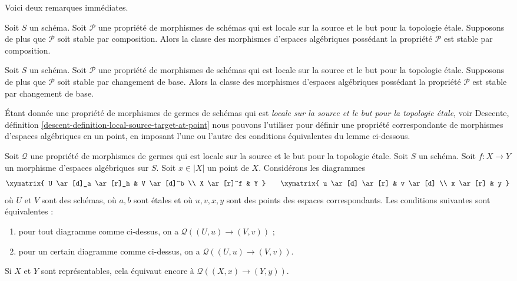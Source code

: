 \noindent
Voici deux remarques immédiates.

\begin{remark}
\label{remark-composition-P}
Soit $S$ un schéma. Soit $\mathcal{P}$ une propriété de morphismes de schémas
qui est locale sur la source et le but pour la topologie étale. Supposons de plus
que $\mathcal{P}$ soit stable par composition. Alors la classe des morphismes
d'espaces algébriques possédant la propriété $\mathcal{P}$ est stable par composition.
\end{remark}

\begin{remark}
\label{remark-base-change-P}
Soit $S$ un schéma. Soit $\mathcal{P}$ une propriété de morphismes de schémas
qui est locale sur la source et le but pour la topologie étale. Supposons de plus
que $\mathcal{P}$ soit stable par changement de base. Alors la classe des morphismes
d'espaces algébriques possédant la propriété $\mathcal{P}$ est stable par changement de base.
\end{remark}

\noindent
Étant donnée une propriété de morphismes de germes de schémas qui est {\it locale
sur la source et le but pour la topologie étale}, voir
Descente, définition \ref{descent-definition-local-source-target-at-point}
nous pouvons l'utiliser pour définir une propriété correspondante de morphismes
d'espaces algébriques en un point, en imposant l'une ou l'autre des
conditions équivalentes du lemme ci-dessous.

\begin{lemma}
\label{lemma-local-source-target-at-point}
Soit $\mathcal{Q}$ une propriété de morphismes de germes qui est
locale sur la source et le but pour la topologie étale.
Soit $S$ un schéma.
Soit $f : X \to Y$ un morphisme d'espaces algébriques sur $S$.
Soit $x \in |X|$ un point de $X$.
Considérons les diagrammes
$$
\xymatrix{
U \ar[d]_a \ar[r]_h & V \ar[d]^b \\
X \ar[r]^f & Y
}
\quad\quad
\xymatrix{
u \ar[d] \ar[r] & v \ar[d] \\
x \ar[r] & y
}
$$
où $U$ et $V$ sont des schémas, où $a, b$ sont étales et où $u, v, x, y$
sont des points des espaces correspondants.
Les conditions suivantes sont équivalentes :
\begin{enumerate}
\item pour tout diagramme comme ci-dessus, on a $\mathcal{Q}((U, u) \to (V, v))$ ;
\item pour un certain diagramme comme ci-dessus, on a $\mathcal{Q}((U, u) \to (V, v))$.
\end{enumerate}
Si $X$ et $Y$ sont représentables, cela équivaut encore
à $\mathcal{Q}((X, x) \to (Y, y))$.
\end{lemma}

